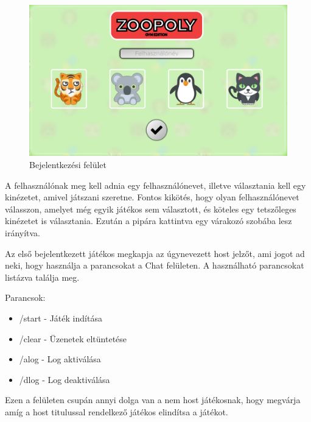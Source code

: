 

\begin{figure}[h!]
\centering
\includegraphics[width=\textwidth]{images/a5187162fb81495697aab2f5f49d6bd0.png}
\caption{Bejelentkezési felület}
\label{fig:ff}
\end{figure}

A felhasználónak meg kell adnia egy felhasználónevet, illetve választania kell egy kinézetet, amivel játszani szeretne. Fontos kikötés, hogy olyan felhasználónevet válasszon, amelyet még egyik játékos sem választott, és köteles egy tetszőleges kinézetet is választania. Ezután a pipára kattintva egy várakozó szobába lesz irányítva.


Az első bejelentkezett játékos megkapja az úgynevezett host jelzőt, ami jogot ad neki, hogy használja a parancsokat a Chat felületen. A használható parancsokat listázva találja meg.

Parancsok:
\begin{itemize}
	\item /start - Játék indítása
	\item /clear - Üzenetek eltüntetése
	\item /alog - Log aktiválása
	\item /dlog - Log deaktiválása
\end{itemize}
Ezen a felületen csupán annyi dolga van a nem host játékosnak, hogy megvárja amíg a host titulussal rendelkező játékos elindítsa a játékot.


